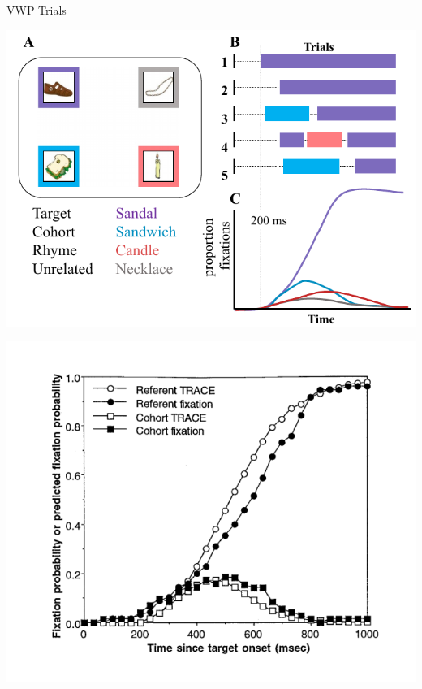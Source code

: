 \documentclass{beamer}
\begin{document}
\begin{frame}{VWP Trials}
\begin{center}
\includegraphics[scale=0.4]{img/bob_vwp_full.png}
\end{center}
\end{frame}


\begin{frame}%
\begin{center}
\includegraphics[scale=.75]{img/trace_compare_edit.pdf}
\end{center}
\end{frame}
\end{document}
